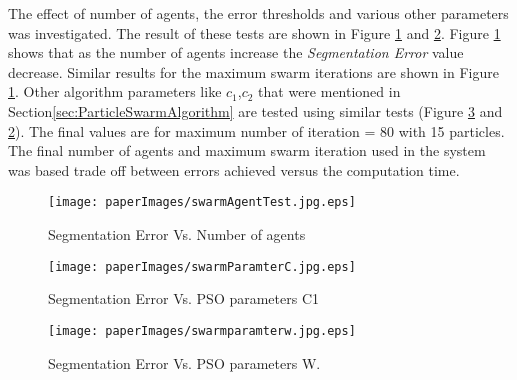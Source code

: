 	 	
 The effect of number of agents, the error thresholds and various other parameters was investigated. The result of these tests are shown in Figure \ref{fig:swarmtesting} and \ref{fig:swarmtesting2}. Figure \ref{fig:swarmtesting} shows that as the number of agents increase the \textit{Segmentation Error} value decrease. Similar results for the maximum swarm iterations are shown in Figure \ref{fig:swarmtesting}.  Other algorithm parameters like $c_1$,$c_2$ that were mentioned in Section\ref{sec:ParticleSwarmAlgorithm} are tested using similar tests (Figure \ref{fig:swarmparamterw.jpg} and \ref{fig:swarmtesting2}). The final values are for maximum number of iteration = 80 with 15 particles. The final number of agents and maximum swarm iteration used in the system was based trade off between errors achieved versus the computation time. 
   
   
    
 \begin{figure}
	\centering		
	 \texttt{[image: paperImages/swarmAgentTest.jpg.eps]}
	 	\caption{Segmentation Error Vs. Number of agents}
	 	\label{fig:swarmtesting}
\end{figure} 

\begin{figure}
	\centering		
	 \texttt{[image: paperImages/swarmParamterC.jpg.eps]}
	 	\caption{Segmentation Error Vs. PSO parameters C1}
	 	\label{fig:swarmtesting2}
	
\end{figure} 


\begin{figure}
	\centering
		\texttt{[image: paperImages/swarmparamterw.jpg.eps]}
	\caption{Segmentation Error Vs. PSO parameters W.}
	\label{fig:swarmparamterw.jpg}
\end{figure}



